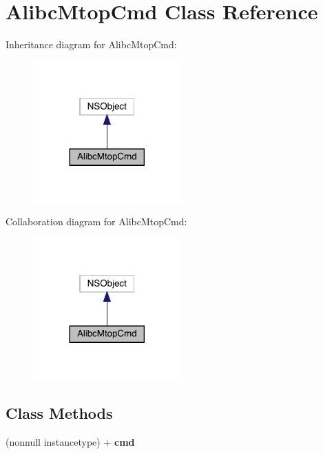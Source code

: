 \hypertarget{interface_alibc_mtop_cmd}{}\section{Alibc\+Mtop\+Cmd Class Reference}
\label{interface_alibc_mtop_cmd}


Inheritance diagram for Alibc\+Mtop\+Cmd\+:\nopagebreak
\begin{figure}[H]
\begin{center}
\leavevmode
\includegraphics[width=161pt]{interface_alibc_mtop_cmd__inherit__graph}
\end{center}
\end{figure}


Collaboration diagram for Alibc\+Mtop\+Cmd\+:\nopagebreak
\begin{figure}[H]
\begin{center}
\leavevmode
\includegraphics[width=161pt]{interface_alibc_mtop_cmd__coll__graph}
\end{center}
\end{figure}
\subsection*{Class Methods}
\begin{DoxyCompactItemize}
\item 
\mbox{\label{interface_alibc_mtop_cmd_a29cdeee01671f53b74465cb21e5fc4c5}} 
(nonnull instancetype) + {\bfseries cmd}
\end{DoxyCompactItemize}
